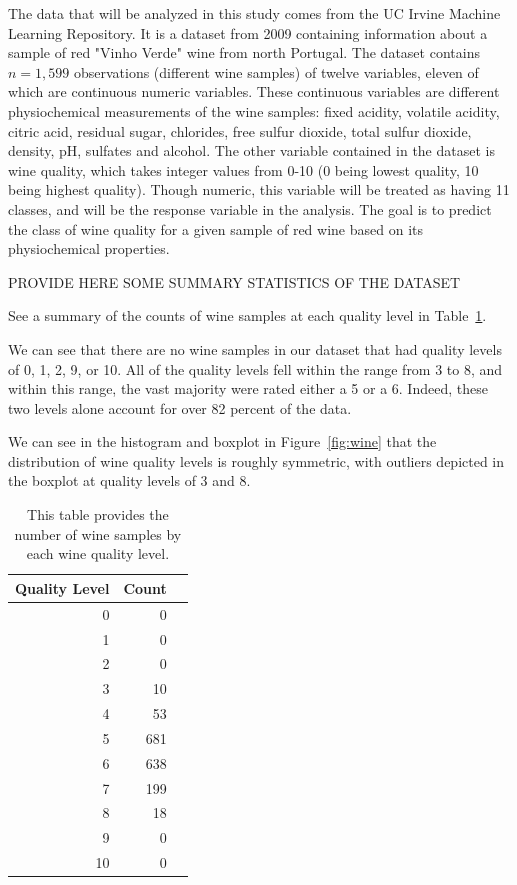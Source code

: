 \documentclass[12pt]{article}
\begin{document}
The data that will be analyzed in this study comes from the UC Irvine Machine 
Learning Repository.  It is a dataset from 2009 containing information about 
a sample of red "Vinho Verde" wine from north Portugal.  The dataset contains 
$n = 1,599$ observations (different wine samples) of twelve variables, eleven 
of which are continuous numeric variables.  These continuous variables are 
different physiochemical measurements of the wine samples: fixed acidity, 
volatile acidity, citric acid, residual sugar, chlorides, free sulfur dioxide, 
total sulfur dioxide, density, pH, sulfates and alcohol.  The other variable 
contained in the dataset is wine quality, which takes integer values from 0-10 
(0 being lowest quality, 10 being highest quality).  Though numeric, this 
variable will be treated as having 11 classes, and will be the response variable 
in the analysis.  The goal is to predict the class of wine quality for a given 
sample of red wine based on its physiochemical properties.  

PROVIDE HERE SOME SUMMARY STATISTICS OF THE DATASET

See a summary of the counts of wine samples at each quality level in 
Table~\ref{tab:qual}.

We can see that there are no wine samples in our dataset that had quality 
levels of 0, 1, 2, 9, or 10.  All of the quality levels fell within the 
range from 3 to 8, and within this range, the vast majority were rated 
either a 5 or a 6.  Indeed, these two levels alone account for over 82 
percent of the data.  

We can see in the histogram and boxplot in Figure~\ref{fig:wine} that 
the distribution of wine quality levels is roughly symmetric, with 
outliers depicted in the boxplot at quality levels of 3 and 8.  

\begin{table}[tbp]
 \caption{This table provides the number of wine samples by each wine quality level.}
\label{tab:qual}
\centering
\begin{tabular}{rrr}
 \toprule
 Quality Level & Count \\ 
 \midrule
0 & 0 \\ 
1 & 0 \\ 
2 & 0 \\ 
3 & 10 \\ 
4 & 53 \\ 
5 & 681 \\ 
6 & 638 \\ 
7 & 199 \\ 
8 & 18 \\ 
9 & 0 \\ 
10 & 0 \\
\bottomrule
\end{tabular}
\end{table}
\end{document}
